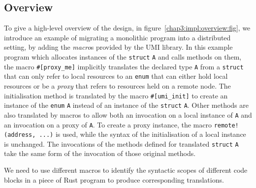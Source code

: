 \subsection{Overview}
\label{chap3:impl:overview}
To give a high-level overview of the design, in figure~\ref{chap3:impl:overview:fig}, we introduce an example of migrating a monolithic program into a distributed setting, by adding the \emph{macro}s provided by the UMI library. In this example program which allocates instances of the \texttt{struct} \texttt{A} and calls methods on them, the macro \texttt{\#[proxy\_me]} implicitly translates the declared type \texttt{A} from a \texttt{struct} that can only refer to local resources to an \texttt{enum} that can either hold local resources or be a \emph{proxy} that refers to resources held on a remote node. The initialisation method is translated by the macro \texttt{\#[umi\_init]} to create an instance of the \texttt{enum} \texttt{A} instead of an instance of the \texttt{struct} \texttt{A}. Other methods are also translated by macros to allow both an invocation on a local instance of \texttt{A} and an invocation on a proxy of \texttt{A}. To create a proxy instance, the macro \texttt{remote!(address, ...)} is used, while the syntax of the initialisation of a local instance is unchanged. The invocations of the methods defined for translated \texttt{struct} \texttt{A} take the same form of the invocation of those original methods. \begin{highlightnew} We need to use different macros to identify the syntactic scopes of different code blocks in a piece of Rust program to produce corresponding translations.\end{highlightnew}

